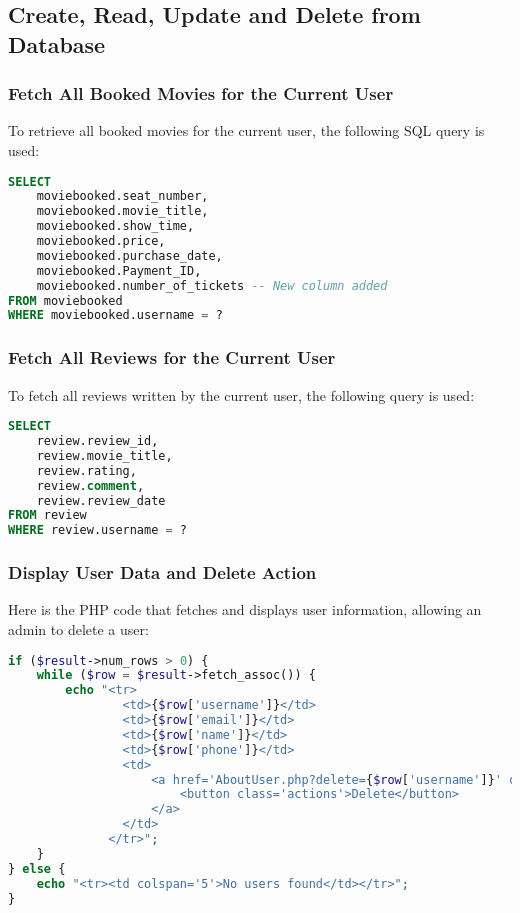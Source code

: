 \documentclass[a4paper,12pt]{article}  %
\begin{document}
\subsection{Create, Read, Update and Delete from Database}

\subsubsection{Fetch All Booked Movies for the Current User}
To retrieve all booked movies for the current user, the following SQL query is used:

\begin{lstlisting}[language=SQL, caption={Fetch All Booked Movies for the Current User}, label={lst:fetch_booked_movies}]
SELECT 
    moviebooked.seat_number, 
    moviebooked.movie_title, 
    moviebooked.show_time, 
    moviebooked.price, 
    moviebooked.purchase_date, 
    moviebooked.Payment_ID,
    moviebooked.number_of_tickets -- New column added
FROM moviebooked
WHERE moviebooked.username = ?
\end{lstlisting}

\subsubsection{Fetch All Reviews for the Current User}
To fetch all reviews written by the current user, the following query is used:

\begin{lstlisting}[language=SQL, caption={Fetch All Reviews for the Current User}, label={lst:fetch_reviews}]
SELECT 
    review.review_id, 
    review.movie_title, 
    review.rating, 
    review.comment, 
    review.review_date 
FROM review
WHERE review.username = ?
\end{lstlisting}

\subsubsection{Display User Data and Delete Action}
Here is the PHP code that fetches and displays user information, allowing an admin to delete a user:

\begin{lstlisting}[language=PHP, caption={Display User Data and Delete Action}, label={lst:user_delete_action}]
if ($result->num_rows > 0) {
    while ($row = $result->fetch_assoc()) {
        echo "<tr>
                <td>{$row['username']}</td>
                <td>{$row['email']}</td>
                <td>{$row['name']}</td>
                <td>{$row['phone']}</td>
                <td>
                    <a href='AboutUser.php?delete={$row['username']}' onclick='return confirm(\"Are you sure you want to delete this user?\");'>
                        <button class='actions'>Delete</button>
                    </a>
                </td>
              </tr>";
    }
} else {
    echo "<tr><td colspan='5'>No users found</td></tr>";
}
\end{lstlisting}
\end{document}
